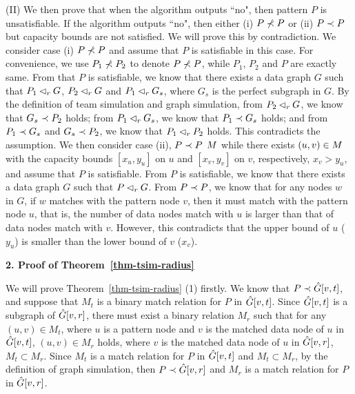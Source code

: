 \vspace{-1.5ex}
(II) We then prove that when the algorithm outputs ``no", then pattern $P$ is unsatisfiable.
If the algorithm outputs ``no", then either (i) $P \not\prec P$ or (ii) $P \prec P$ but capacity bounds are not satisfied.
We will prove this by contradiction.
We consider case (i) $P \not\prec P$ and assume that $P$ is satisfiable in this case.
For convenience, we use $P_1 \not\prec P_2$ to denote $P \not\prec P$, while $P_1$, $P_2$ and $P$ are exactly same.
From that $P$ is satisfiable, we know that there exists a data graph $G$ such that $P_1 \lhd_r G$, $P_2 \lhd_r G$ and $P_1 \lhd_r G_s$, where $G_s$ is the perfect subgraph in $G$.
By the definition of team simulation and graph simulation, from $P_2 \lhd_r G$, we know that $G_s \prec P_2$ holds;
from $P_1 \lhd_r G_s$, we know that $P_1 \prec G_s$ holds; and 
from $P_1 \prec G_s$ and  $G_s \prec P_2$, we know that $P_1 \lhd_r P_2$ holds.
This contradicts the assumption.
We then consider case (ii), \ie $P \prec P$ \wrt $M$ while there exists $(u, v)\in M$ with the capacity bounds $[x_u, y_u]$ on $u$ and $[x_v, y_v]$ on $v$, respectively, $x_v > y_u$, and assume that $P$ is satisfiable.
From $P$ is satisfiable, we know that there exists a data graph $G$ such that $P \lhd_r G$.
From $P \prec P$, we know that for any nodes $w$ in $G$, if $w$ matches with the pattern node $v$, then it must match with the pattern node $u$, that is, the number of data nodes match with $u$ is larger than that of data nodes match with $v$.
However, this contradicts that the upper bound of $u$ ($y_u$) is smaller than the lower bound of $v$ ($x_v$).



\noindent
{\textbf{2. Proof of Theorem~\ref{thm-tsim-radius}}}

We will prove Theorem~\ref{thm-tsim-radius} (1) firstly.
We know that $P\prec \hat{G}{[v, t]}$, and suppose that $M_t$ is a binary match relation for $P$ in $\hat{G}{[v, t]}$.
Since $\hat{G}{[v, t]}$ is a subgraph of $\hat{G}{[v, r]}$, 
there must exist a binary relation $M_r$ such that for any $(u, v) \in M_t$, where $u$ is a pattern node and $v$ is the matched data node of $u$ in $\hat{G}{[v, t]}$, 
$(u, v) \in M_r$ holds, where $v$ is the matched data node of $u$ in $\hat{G}{[v, r]}$, \ie $M_t \subset M_r$.
Since $M_t$ is a match relation for $P$ in $\hat{G}{[v, t]}$ and $M_t \subset M_r$, by the definition of graph simulation, then $P\prec \hat{G}{[v, r]}$ and $M_r$ is a match relation for $P$ in $\hat{G}{[v, r]}$.	

